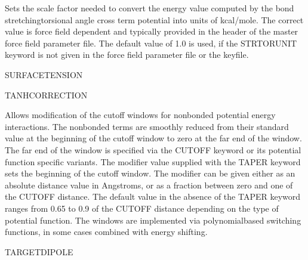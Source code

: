 \documentclass[letterpaper,11pt,english]{sphinxmanual}
\begin{document}
\ignorespaces {}\label{\detokenize{text/keywords:key-strtorunit}}\begin{description}
\sphinxAtStartPar
Sets the scale factor needed to convert the energy value computed by the bond stretching\sphinxhyphen{}torsional angle cross term potential into units of kcal/mole. The correct value is force field dependent and typically provided in the header of the master force field parameter file. The default value of 1.0 is used, if the STRTORUNIT keyword is not given in the force field parameter file or the keyfile.

\end{description}

\ignorespaces {}\label{\detokenize{text/keywords:key-surface-tension}}
\sphinxAtStartPar
SURFACE\sphinxhyphen{}TENSION

\ignorespaces {}\label{\detokenize{text/keywords:key-tanh-correction}}
\sphinxAtStartPar
TANH\sphinxhyphen{}CORRECTION

\ignorespaces {}\label{\detokenize{text/keywords:key-taper}}\begin{description}
\sphinxAtStartPar
Allows modification of the cutoff windows for nonbonded potential energy interactions. The nonbonded terms are smoothly reduced from their standard value at the beginning of the cutoff window to zero at the far end of the window. The far end of the window is specified via the CUTOFF keyword or its potential function specific variants. The modifier value supplied with the TAPER keyword sets the beginning of the cutoff window. The modifier can be given either as an absolute distance value in Angstroms, or as a fraction between zero and one of the CUTOFF distance. The default value in the absence of the TAPER keyword ranges from 0.65 to 0.9 of the CUTOFF distance depending on the type of potential function. The windows are implemented via polynomial\sphinxhyphen{}based switching functions, in some cases combined with energy shifting.

\end{description}

\ignorespaces {}\label{\detokenize{text/keywords:key-target-dipole}}
\sphinxAtStartPar
TARGET\sphinxhyphen{}DIPOLE
\end{document}
